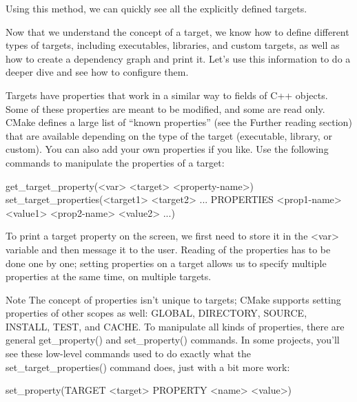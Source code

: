 
Using this method, we can quickly see all the explicitly defined targets.

Now that we understand the concept of a target, we know how to define different types of targets, including executables, libraries, and custom targets, as well as how to create a dependency graph and print it. Let’s use this information to do a deeper dive and see how to configure them.


Targets have properties that work in a similar way to fields of C++ objects. Some of these properties are meant to be modified, and some are read only. CMake defines a large list of “known properties” (see the Further reading section) that are available depending on the type of the target (executable, library, or custom). You can also add your own properties if you like. Use the following commands to manipulate the properties of a target:

\begin{shell}
get_target_property(<var> <target> <property-name>)
set_target_properties(<target1> <target2> ...
                      PROPERTIES <prop1-name> <value1>
                      <prop2-name> <value2> ...)
\end{shell}

To print a target property on the screen, we first need to store it in the <var> variable and then message it to the user. Reading of the properties has to be done one by one; setting properties on a target allows us to specify multiple properties at the same time, on multiple targets.

\begin{myNotic}{Note}
The concept of properties isn’t unique to targets; CMake supports setting properties of other scopes as well: GLOBAL, DIRECTORY, SOURCE, INSTALL, TEST, and CACHE. To manipulate all kinds of properties, there are general get\_property() and set\_property() commands. In some projects, you’ll see these low-level commands used to do exactly what the set\_target\_properties() command does, just with a bit more work:

\begin{shell}
set_property(TARGET <target> PROPERTY <name> <value>)
\end{shell}
\end{myNotic}

